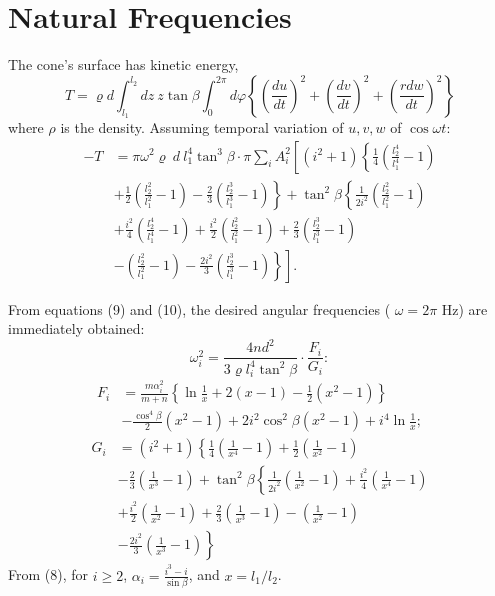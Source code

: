 \documentclass{amsart}
\begin{document}
\section{Natural Frequencies}
The cone's surface has kinetic energy,
\[
T=\varrho d \int_{l_1}^{l_2} d z ~ z \tan \beta \int_0^{2 \pi} d \varphi\left\{\left(\frac{d u}{d t}\right)^2+\left(\frac{d v}{d t}\right)^2+\left(\frac{r d w}{d t}\right)^2\right\}
\]
where \(\rho\) is the density.  Assuming temporal variation of \(u,v,w\) of \(\cos \omega t\):
\begin{equation}\label{eq10p734}
\begin{aligned}
-T & = \pi \omega^2 \varrho ~ d ~ l_1^4 \tan^3 \beta \cdot \pi \sum_i A_i^2\left[( i ^ { 2 } + 1 ) \left\{\frac{1}{4}\left(\frac{l_2^4}{l_1^4}-1\right)\right.\right. \\
& \left.+\frac{1}{2}\left(\frac{l_2^2}{l_1^2}-1\right)-\frac{2}{3}\left(\frac{l_2^3}{l_1^3}-1\right)\right\}+\tan^2 \beta\left\{\frac{1}{2 i^2}\left(\frac{l_2^2}{l_1^2}-1\right)\right. \\
& +\frac{i^2}{4}\left(\frac{l_2^4}{l_1^4}-1\right)+\frac{i^2}{2}\left(\frac{l_2^2}{l_1^2}-1\right)+\frac{2}{3}\left(\frac{l_2^3}{l_1^3}-1\right) \\
& \left.\left.-\left(\frac{l_2^2}{l_1^2}-1\right)-\frac{2 i^2}{3}\left(\frac{l_2^3}{l_1^3}-1\right)\right\}\right] .
\end{aligned}
\end{equation}

From equations (9) and (10), the desired angular frequencies
( \(\omega=2 \pi\) Hz) are immediately obtained:
\begin{equation}\label{eq11p734}
\omega_i^2=\frac{4 n d^2}{3 \varrho l_i^4 \tan^2 \beta} \cdot \frac{F_i}{G_i}:
\end{equation}
\begin{equation}\label{eq12p734}
\begin{aligned}
F_i & =\frac{m \alpha_i^2}{m+n}\left\{\ln \frac{1}{x}+2(x-1)-\frac{1}{2}\left(x^2-1\right)\right\} \\
& -\frac{\cos ^4 \beta}{2}\left(x^2-1\right)+2 i^2 \cos ^2 \beta\left(x^2-1\right)+i^4 \ln \frac{1}{x} ;
\end{aligned}
\end{equation}
\begin{equation}\label{eq13p734}
\begin{aligned}
G_i & =\left(i^2+1\right)\left\{\frac{1}{4}\left(\frac{1}{x^4}-1\right)+\frac{1}{2}\left(\frac{1}{x^2}-1\right)\right. \\
& -\frac{2}{3}\left(\frac{1}{x^3}-1\right)+\tan^2 \beta\left\{\frac{1}{2 i^2}\left(\frac{1}{x^2}-1\right)+\frac{i^2}{4}\left(\frac{1}{x^4}-1\right)\right. \\
& +\frac{i^2}{2}\left(\frac{1}{x^2}-1\right)+\frac{2}{3}\left(\frac{1}{x^3}-1\right)-\left(\frac{1}{x^2}-1\right) \\
& \left.-\frac{2 i^2}{3}\left(\frac{1}{x^3}-1\right)\right\}
\end{aligned}
\end{equation}
From (8), for \(i\geq 2\), \(\alpha_i=\frac{i^3-i}{\sin \beta}\), and \(x=l_1/l_2\).
\end{document}

